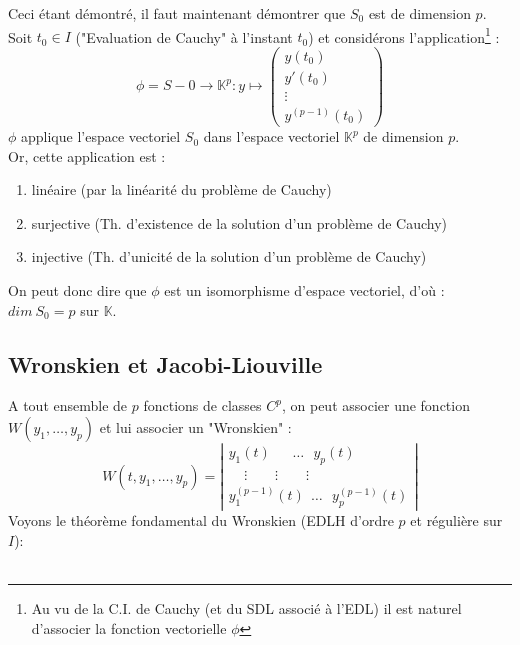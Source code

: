 \documentclass[11pt, a4paper, openany]{book}
\begin{document}
Ceci étant démontré, il faut maintenant démontrer que $S_0$ est de dimension $p$. Soit $t_0 \in I$ ("Evaluation de Cauchy" à l'instant $t_0$) et considérons l'application\footnote{Au vu de la C.I. de Cauchy (et du SDL associé à l'EDL) il est naturel d'associer la fonction vectorielle $\phi$} :
\begin{equation}
	\phi = S-0 \rightarrow \mathbb{K}^p : y \mapsto \left( \begin{array}{c}
	y(t_0)\\
	y'(t_0) \\
	\vdots \\
	y^{(p-1)}(t_0)
	\end{array} \right)
\end{equation}
$\phi$ applique l'espace vectoriel $S_0$ dans l'espace vectoriel $\mathbb{K}^p$ de dimension $p$.\\
Or, cette application est : 
\begin{enumerate}
	\item linéaire (par la linéarité du problème de Cauchy)
	\item surjective (Th. d'existence de la solution d'un problème de Cauchy)
	\item injective (Th. d'unicité de la solution d'un problème de Cauchy)
\end{enumerate}
On peut donc dire que $\phi$ est un isomorphisme d'espace vectoriel, d'où : $dim\ S_0 = p$ sur $\mathbb{K}$.
		
\subsection{Wronskien et Jacobi-Liouville}
A tout ensemble de $p$ fonctions de classes $C^p$, on peut associer une fonction $W(y_1, \dots, y_p)$ et lui associer un "Wronskien" :
\begin{equation}
	W(t, y_1,\dots,y_p) = \left|\begin{array}{l}
	y_1(t)\ \ \   \ \ \  \  \dots  \  \ \  y_p(t)\\
	\ \ \ \ \ \vdots\ \ \ \ \ \ \ \ \ \vdots\ \ \ \ \ \ \ \ \ \vdots\\
	y_1^{(p-1)}(t)\ \ \dots\ \ \ y_p^{(p-1)}(t)
	\end{array}\right|
\end{equation}
Voyons le théorème fondamental du Wronskien (EDLH d'ordre $p$ et régulière sur $I$): \\
\ \\
		
\end{document}
